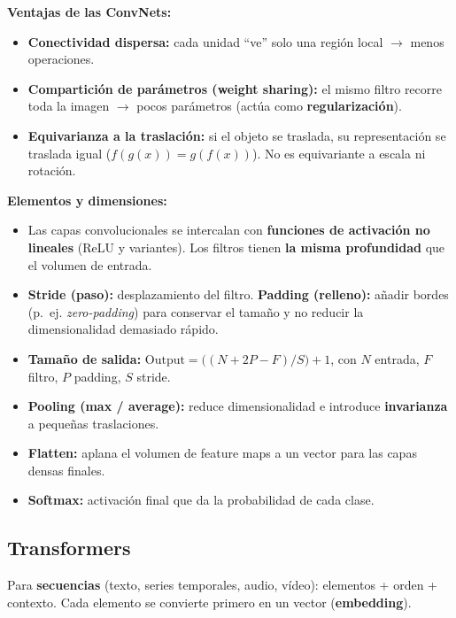 \documentclass[12pt]{book} %
\providecommand{\tightlist}{%
  \setlength{\itemsep}{0pt}\setlength{\parskip}{0pt}}
\begin{document}
\textbf{Ventajas de las ConvNets:}

\begin{itemize}
\tightlist
\item
  \textbf{Conectividad dispersa:} cada unidad ``ve'' solo una región
  local \(\to\) menos operaciones.
\item
  \textbf{Compartición de parámetros (weight sharing):} el mismo filtro
  recorre toda la imagen \(\to\) pocos parámetros (actúa como
  \textbf{regularización}).
\item
  \textbf{Equivarianza a la traslación:} si el objeto se traslada, su
  representación se traslada igual (\(f(g(x))=g(f(x))\)). No es
  equivariante a escala ni rotación.
\end{itemize}

\textbf{Elementos y dimensiones:}

\begin{itemize}
\tightlist
\item
  Las capas convolucionales se intercalan con \textbf{funciones de
  activación no lineales} (ReLU y variantes). Los filtros tienen
  \textbf{la misma profundidad} que el volumen de entrada.
\item
  \textbf{Stride (paso):} desplazamiento del filtro. \textbf{Padding
  (relleno):} añadir bordes (p.~ej. \emph{zero-padding}) para conservar
  el tamaño y no reducir la dimensionalidad demasiado rápido.
\item
  \textbf{Tamaño de salida:}
  \(\text{Output} = \big((N + 2P - F)/S\big) + 1\), con \(N\) entrada,
  \(F\) filtro, \(P\) padding, \(S\) stride.
\item
  \textbf{Pooling (max / average):} reduce dimensionalidad e introduce
  \textbf{invarianza} a pequeñas traslaciones.
\item
  \textbf{Flatten:} aplana el volumen de feature maps a un vector para
  las capas densas finales.
\item
  \textbf{Softmax:} activación final que da la probabilidad de cada
  clase.
\end{itemize}

\hypertarget{transformers}{%
\subsection{Transformers}\label{transformers}}

Para \textbf{secuencias} (texto, series temporales, audio, vídeo):
elementos + orden + contexto. Cada elemento se convierte primero en un
vector (\textbf{embedding}).
\end{document}
